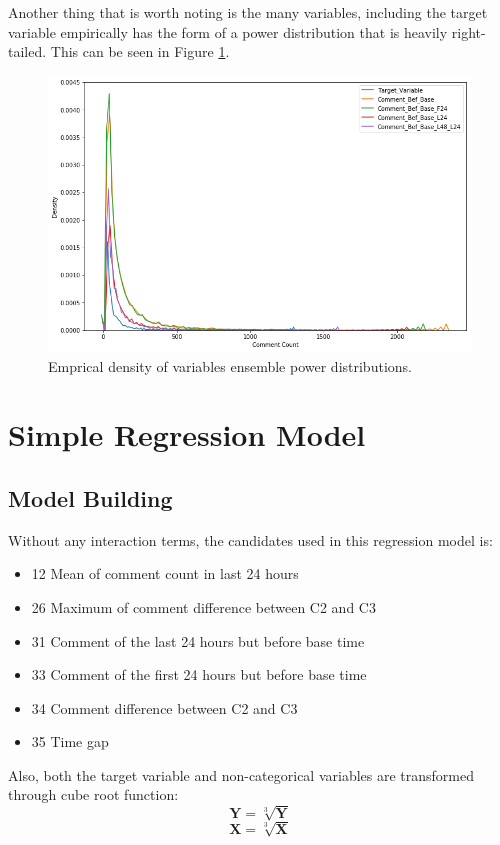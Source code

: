 \documentclass[]{article}
\begin{document}
Another thing that is worth noting is the many variables, including the target variable empirically has the form of a power distribution that is heavily right-tailed. This can be seen in Figure \ref{fig:density}. 
%
\begin{figure}[hbtp]
	\centering
	\includegraphics[width=1\columnwidth]{../Figures/density_plot}
	\caption{Emprical density of variables ensemble power distributions.}
	\label{fig:density}
\end{figure}
%



\section{Simple Regression Model}
\subsection{Model Building}
Without any interaction terms, the candidates used in this regression model is:
\begin{itemize}
	\item 12 Mean of comment count in last 24 hours
	\item 26 Maximum of comment difference between C2 and C3
	\item 31 Comment of the last 24 hours but before base time
	\item 33 Comment of the first 24 hours but before base time
	\item 34 Comment difference between C2 and C3
	\item 35 Time gap
\end{itemize}

Also, both the target variable and non-categorical variables are transformed through cube root function:
\begin{equation}
	\mathbf{Y} = \sqrt[3]{\mathbf{Y}}
\end{equation}
\begin{equation}
	\mathbf{X} = \sqrt[3]{\mathbf{X}}
\end{equation}
\end{document}
